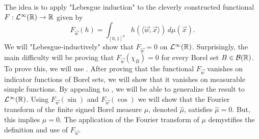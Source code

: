 \begin{proof-idea*}
The idea is to apply "Lebesgue induction" to the cleverly constructed functional $F : {\mathcal {L}^\infty}({\mathbb R}) \to {\mathbb R}$ given by \[
    F_{\vec{w}}(h) = \int_{[0,1]^n} h ( \langle \vec{w}, \vec{x} \rangle) \, d \mu( \vec{x}).
\]
We will "Lebesgue-inductively" show that $F_{\vec{w}} = 0$ on ${\mathcal {L}^\infty}({\mathbb R})$. Surprisingly, the main difficulty will be proving that $F_{\vec{w}}(\chi_{B}) = 0$ for every Borel set $B \in {\mathcal B}({\mathbb R})$. To prove this, we will use . After proving that the functional $F_\vec{w}$ vanishes on indicator functions of Borel sets, we will show that it vanishes on measurable simple functions. By appealing to , we will be able to generalize the result to ${\mathcal {L}^\infty}({\mathbb R})$. Using $F_{\vec{w}}(\sin)$ and $F_{\vec{w}}(\cos)$ we will show that the Fourier transform of the finite signed Borel measure $\mu$, denoted $\widehat{\mu}$, satisfies $\widehat{\mu} = 0$. But, this implies $\mu = 0$. The application of the Fourier transform of $\mu$ demystifies the definition and use of $F_\vec{w}$.
\end{proof-idea*}
